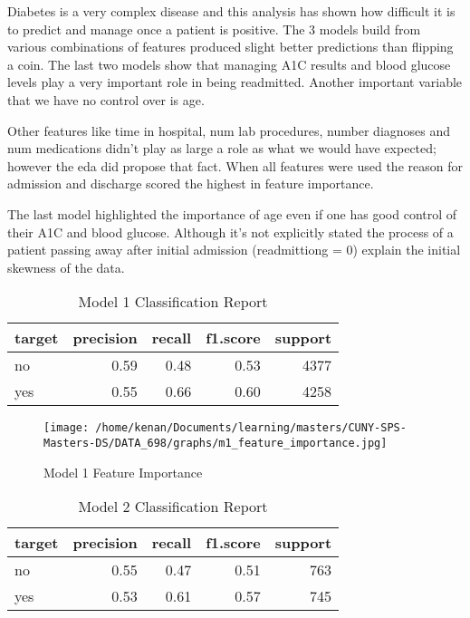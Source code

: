 \documentclass[5p]{elsarticle} %
\begin{document}
Diabetes is a very complex disease and this analysis has shown how
difficult it is to predict and manage once a patient is positive. The 3
models build from various combinations of features produced slight
better predictions than flipping a coin. The last two models show that
managing A1C results and blood glucose levels play a very important role
in being readmitted. Another important variable that we have no control
over is age.

Other features like time in hospital, num lab procedures, number
diagnoses and num medications didn't play as large a role as what we
would have expected; however the eda did propose that fact. When all
features were used the reason for admission and discharge scored the
highest in feature importance.

The last model highlighted the importance of age even if one has good
control of their A1C and blood glucose. Although it's not explicitly
stated the process of a patient passing away after initial admission
(readmittiong = 0) explain the initial skewness of the data.

\clearpage
\onecolumn

\begin{table}

\caption{\label{tab:unnamed-chunk-3}Model 1 Classification Report}
\centering
\begin{tabular}[t]{l|r|r|r|r}
\hline
target & precision & recall & f1.score & support\\
\hline
no & 0.59 & 0.48 & 0.53 & 4377\\
\hline
yes & 0.55 & 0.66 & 0.60 & 4258\\
\hline
\end{tabular}
\end{table}

\begin{figure}
\hypertarget{id}{%
\centering
\texttt{[image: /home/kenan/Documents/learning/masters/CUNY-SPS-Masters-DS/DATA\_698/graphs/m1\_feature\_importance.jpg]}
\caption{Model 1 Feature Importance}\label{id}
}
\end{figure}

\begin{table}

\caption{\label{tab:unnamed-chunk-4}Model 2 Classification Report}
\centering
\begin{tabular}[t]{l|r|r|r|r}
\hline
target & precision & recall & f1.score & support\\
\hline
no & 0.55 & 0.47 & 0.51 & 763\\
\hline
yes & 0.53 & 0.61 & 0.57 & 745\\
\hline
\end{tabular}
\end{table}
\end{document}
